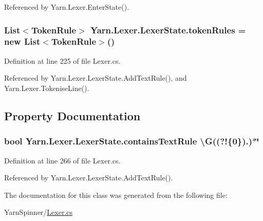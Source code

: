Referenced by Yarn.\-Lexer.\-Enter\-State().

\hypertarget{a00128_adf6563b1dc6f3ef80ed13c2b15b7be03}{
\subsubsection[{token\-Rules}]{\setlength{\rightskip}{0pt plus 5cm}List$<${\bf Token\-Rule}$>$ Yarn.\-Lexer.\-Lexer\-State.\-token\-Rules = new List$<${\bf Token\-Rule}$>$()}}\label{a00128_adf6563b1dc6f3ef80ed13c2b15b7be03}


Definition at line 225 of file Lexer.\-cs.



Referenced by Yarn.\-Lexer.\-Lexer\-State.\-Add\-Text\-Rule(), and Yarn.\-Lexer.\-Tokenise\-Line().



\subsection{Property Documentation}
\hypertarget{a00128_a69948f05c35eeae9cb8448c849a053e6}{
\subsubsection[{contains\-Text\-Rule}]{\setlength{\rightskip}{0pt plus 5cm}bool Yarn.\-Lexer.\-Lexer\-State.\-contains\-Text\-Rule \textbackslash{}G((?!\{0\}).)$\ast$\char`\"{}\hspace{0.3cm}{\ttfamily [get]}}}\label{a00128_a69948f05c35eeae9cb8448c849a053e6}


Definition at line 266 of file Lexer.\-cs.



Referenced by Yarn.\-Lexer.\-Lexer\-State.\-Add\-Text\-Rule().



The documentation for this class was generated from the following file\-:\begin{DoxyCompactItemize}
\item 
Yarn\-Spinner/\hyperlink{a00310}{Lexer.\-cs}\end{DoxyCompactItemize}
